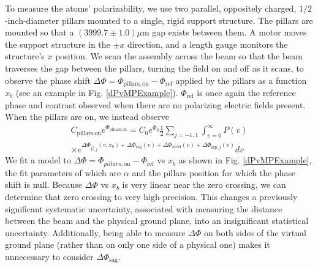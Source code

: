 \documentclass[twocolumn,prl,showpacs,superscriptaddress]{revtex4-1}   %
\newcommand{\figref}[1]{Fig. \ref{#1}}
\newcommand{\dphisepj}{\Delta\Phi_{\mathrm{sep},j}}
\newcommand{\dphisag}{\Delta\Phi_{\mathrm{sag}}}
\newcommand{\dphiaccel}{\Delta\Phi_{\mathrm{accel}}}
\begin{document}
To measure the atoms' polarizability, we use two parallel, oppositely charged, $1/2$-inch-diameter pillars mounted to a single, rigid support structure. The pillars are mounted so that a $(3999.7 \pm 1.0)\mu$m gap exists between them. A motor moves the support structure in the $\pm x$ direction, and a length gauge monitors the structure's $x$ position. We scan the assembly across the beam so that the beam traverses the gap between the pillars, turning the field on and off as it scans, to observe the phase shift $\Delta\Phi = \Phi_{\mathrm{pillars,on}} - \Phi_{\mathrm{ref}}$ applied by the pillars as a function $x_b$ (see an example in \figref{dPvMPExample}). $\Phi_{\mathrm{ref}}$ is once again the reference phase and contrast observed when there are no polarizing electric fields present.
When the pillars are on, we instead observe
\begin{align}
	C_{\textrm{pillars,on}}e^{\Phi_{\textrm{pillars,on}}} = 
		C_0e^{\Phi_0}		
		\frac{1}{2} \sum_{j=-1,1}
		\int_{v=0}^{\infty} P(v) \nonumber \\ \times
		e^{
			\Delta\Phi_{\vec{E},j}(v,x_b) + 
			\dphisag(v) + \dphiaccel(v) + \dphisepj(v)
		} 
		dv
	\label{CPPolesEOn}
\end{align}
We fit a model to $\Delta\Phi = \Phi_{pillars,\mathrm{on}} - \Phi_{\mathrm{ref}}$ vs $x_b$ as shown in \figref{dPvMPExample}, the fit parameters of which are $\alpha$ and the pillars position for which the phase shift is null. Because $\Delta\Phi$ vs $x_b$ is very linear near the zero crossing, we can determine that zero crossing to very high precision. 
This changes a previously significant systematic uncertainty, associated with measuring the distance between the beam and the physical ground plane, into an insignificant statistical uncertainty.
Additionally, being able to measure $\Delta\Phi$ on both sides of the virtual ground plane (rather than on only one side of a physical one) makes it unnecessary to consider $\dphisag$. 
\end{document}
